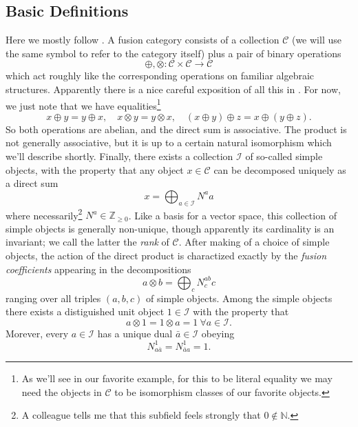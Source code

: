 \documentclass[11pt,letterpaper]{article}
\newcommand{\mc}[1]{\mathcal{#1}}
\begin{document}
\subsection{Basic Definitions}
Here we mostly follow \cite{Santaniello:2026urh}. A fusion category consists of a collection $\mc{C}$ (we will use the same symbol to refer to the category itself) plus a pair of binary operations \begin{equation}
\oplus, \otimes: \mc{C} \times \mc{C} \to \mc{C}
\end{equation}
which act roughly like the corresponding operations on familiar algebraic structures. Apparently there is a nice careful exposition of all this in \cite{Fuchs:2002cm}. For now, we just note that we have equalities\footnote{As we'll see in our favorite example, for this to be literal equality we may need the objects in $\mc{C}$ to be isomorphism classes of our favorite objects.} \begin{equation}
x \oplus y = y \oplus x, \quad x \otimes y = y \otimes x, \quad (x \oplus y) \oplus z = x \oplus (y \oplus z).
\end{equation}
So both operations are abelian, and the direct sum is associative. The product is not generally associative, but it is up to a certain natural isomorphism which we'll describe shortly. Finally, there exists a collection $\mathscr{I}$ of so-called simple objects, with the property that any object $x \in \mc{C}$ can be decomposed uniquely as a direct sum \begin{equation}
x = \bigoplus_{a \in \mathscr{I}} N^a a
\end{equation}
where necessarily\footnote{A colleague tells me that this subfield feels strongly that $0 \notin \mathbb{N}$.} $N^a \in \mathbb{Z}_{\geq 0}$. Like a basis for a vector space, this collection of simple objects is generally non-unique, though apparently its cardinality is an invariant; we call the latter the \textit{rank} of $\mc{C}$. After making of a choice of simple objects, the action of the direct product is charactized exactly by the \textit{fusion coefficients} appearing in the decompositions \begin{equation}
a \otimes b = \bigoplus_c N^{ab}_c c
\end{equation}
ranging over all triples $(a,b,c)$ of simple objects. Among the simple objects there exists a distiguished unit object $1 \in \mathscr{I}$ with the property that \begin{equation}
a \otimes 1 = 1 \otimes a = 1 \ \forall a \in \mathscr{I}.
\end{equation}
Morever, every $a \in \mathscr{I}$ has a unique dual $\bar{a} \in \mathscr{I}$ obeying \begin{equation}
N_{a \bar{a}}^1 = N_{\bar{a} a}^1 = 1.
\end{equation}
\end{document}
